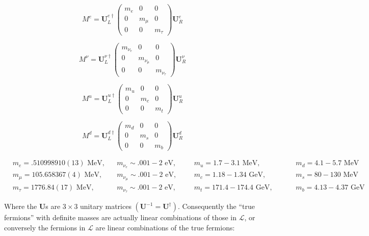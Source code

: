 \documentclass[12pt,a4paper,pagesize=pdftex]{scrartcl}
\begin{document}
\begin{equation*}
	M^e=\mathbf{U}_L^{e\dagger}\left(\begin{matrix}m_e&0&0\\0&m_\mu&0\\0&0&m_\tau\end{matrix}\right)\mathbf{U}_R^e
\end{equation*}

\begin{equation*}
	M^\nu=\mathbf{U}_L^{\nu\dagger}\left(\begin{matrix}m_{\nu_e}&0&0\\0&m_{\nu_\mu}&0\\0&0&m_{\nu_\tau}\end{matrix}\right)\mathbf{U}_R^\nu
\end{equation*}

\begin{equation*}
	M^u=\mathbf{U}_L^{u\dagger}\left(\begin{matrix}m_u&0&0\\0&m_c&0\\0&0&m_t\end{matrix}\right)\mathbf{U}_R^u
\end{equation*}

\begin{equation*}
	M^d=\mathbf{U}_L^{d\dagger}\left(\begin{matrix}m_d&0&0\\0&m_s&0\\0&0&m_b\end{matrix}\right)\mathbf{U}_R^d
\end{equation*}

\begin{align*}
	&m_e=.510998910(13)\text{ MeV}, &&m_{\nu_e}\sim.001-2\text{ eV}, &&&m_u=1.7-3.1\text{ MeV}, &&&&m_d=4.1-5.7\text{ MeV} \\
	&m_\mu=105.658367(4)\text{ MeV}, &&m_{\nu_\mu}\sim.001-2\text{ eV}, &&&m_c=1.18-1.34\text{ GeV}, &&&&m_s=80-130\text{ MeV} \\
	&m_\tau=1776.84(17)\text{ MeV}, &&m_{\nu_\tau}\sim.001-2\text{ eV}, &&&m_t=171.4-174.4\text{ GeV}, &&&&m_b=4.13-4.37\text{ GeV}
\end{align*}

Where the $\mathbf{U}$s are $3\times3$ unitary matrices $\left(\mathbf{U}^{-1}=\mathbf{U}^\dagger\right)$. Consequently the ``true fermions'' with definite masses are actually linear combinations of those in $\mathcal{L}$, or conversely the fermions in $\mathcal{L}$ are linear combinations of the true fermions:
\end{document}
